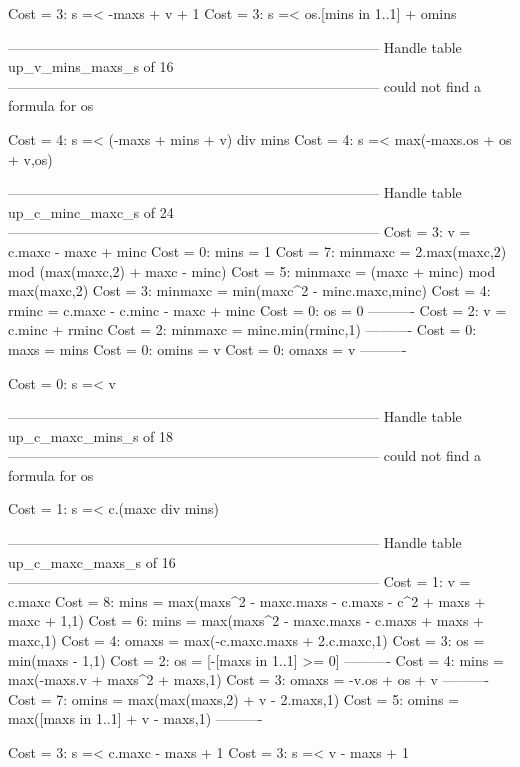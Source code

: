 Cost =  3:  s =< -maxs + v + 1
Cost =  3:  s =< os.[mins in 1..1] + omins

--------------------------------------------------------------------------------
Handle table up_v_mins_maxs_s of 16
--------------------------------------------------------------------------------
could not find a formula for os

Cost =  4:  s =< (-maxs + mins + v) div mins
Cost =  4:  s =< max(-maxs.os + os + v,os)

--------------------------------------------------------------------------------
Handle table up_c_minc_maxc_s of 24
--------------------------------------------------------------------------------
Cost =  3:  v       = c.maxc - maxc + minc
Cost =  0:  mins    = 1
Cost =  7:  minmaxc = 2.max(maxc,2) mod (max(maxc,2) + maxc - minc)
Cost =  5:  minmaxc = (maxc + minc) mod max(maxc,2)
Cost =  3:  minmaxc = min(maxc^2 - minc.maxc,minc)
Cost =  4:  rminc   = c.maxc - c.minc - maxc + minc
Cost =  0:  os      = 0
----------
Cost =  2:  v       = c.minc + rminc
Cost =  2:  minmaxc = minc.min(rminc,1)
----------
Cost =  0:  maxs    = mins
Cost =  0:  omins   = v
Cost =  0:  omaxs   = v
----------

Cost =  0:  s =< v

--------------------------------------------------------------------------------
Handle table up_c_maxc_mins_s of 18
--------------------------------------------------------------------------------
could not find a formula for os

Cost =  1:  s =< c.(maxc div mins)

--------------------------------------------------------------------------------
Handle table up_c_maxc_maxs_s of 16
--------------------------------------------------------------------------------
Cost =  1:  v     = c.maxc
Cost =  8:  mins  = max(maxs^2 - maxc.maxs - c.maxs - c^2 + maxs + maxc + 1,1)
Cost =  6:  mins  = max(maxs^2 - maxc.maxs - c.maxs + maxs + maxc,1)
Cost =  4:  omaxs = max(-c.maxc.maxs + 2.c.maxc,1)
Cost =  3:  os    = min(maxs - 1,1)
Cost =  2:  os    = [-[maxs in 1..1] >= 0]
----------
Cost =  4:  mins  = max(-maxs.v + maxs^2 + maxs,1)
Cost =  3:  omaxs = -v.os + os + v
----------
Cost =  7:  omins = max(max(maxs,2) + v - 2.maxs,1)
Cost =  5:  omins = max([maxs in 1..1] + v - maxs,1)
----------

Cost =  3:  s =< c.maxc - maxs + 1
Cost =  3:  s =< v - maxs + 1
